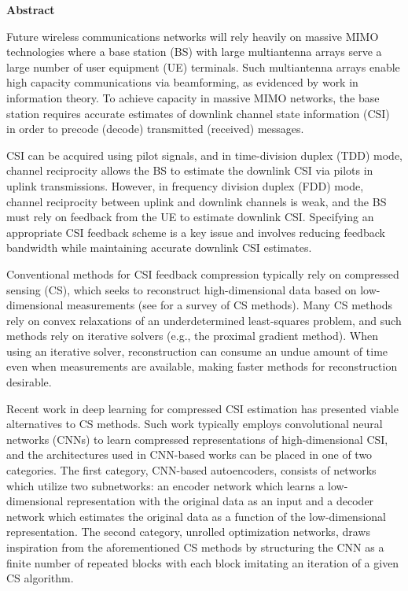 \newpage
{\baselineskip 14pt   } \vspace{27pt}
\centerline{\Huge \bf {Abstract}} \vspace{18pt}

Future wireless communications networks will rely heavily on massive MIMO technologies where a base station (BS) with large multiantenna arrays serve a large number of user equipment (UE) terminals. Such multiantenna arrays enable high capacity communications via beamforming, as evidenced by work in information theory. To achieve capacity in massive MIMO networks, the base station requires accurate estimates of downlink channel state information (CSI) in order to precode (decode) transmitted (received) messages.

CSI can be acquired using pilot signals, and in time-division duplex (TDD) mode, channel reciprocity allows the BS to estimate the downlink CSI via pilots in uplink transmissions. However, in frequency division duplex (FDD) mode, channel reciprocity between uplink and downlink channels is weak, and the BS must rely on feedback from the UE to estimate downlink CSI. Specifying an appropriate CSI feedback scheme is a key issue and involves reducing feedback bandwidth while maintaining accurate downlink CSI estimates.

Conventional methods for CSI feedback compression typically rely on compressed sensing (CS), which seeks to reconstruct high-dimensional data based on low-dimensional measurements (see for a survey of CS methods). Many CS methods rely on convex relaxations of an underdetermined least-squares problem, and such methods rely on iterative solvers (e.g., the proximal gradient method). When using an iterative solver, reconstruction can consume an undue amount of time even when measurements are available, making faster methods for reconstruction desirable.

Recent work in deep learning for compressed CSI estimation has presented viable alternatives to CS methods. Such work typically employs convolutional neural networks (CNNs) to learn compressed representations of high-dimensional CSI, and the architectures used in CNN-based works can be placed in one of two categories. The first category, CNN-based autoencoders, consists of networks which utilize two subnetworks: an encoder network which learns a low-dimensional representation with the original data as an input and a decoder network which estimates the original data as a function of the low-dimensional representation. The second category, unrolled optimization networks, draws inspiration from the aforementioned CS methods by structuring the CNN as a finite number of repeated blocks with each block imitating an iteration of a given CS algorithm.


